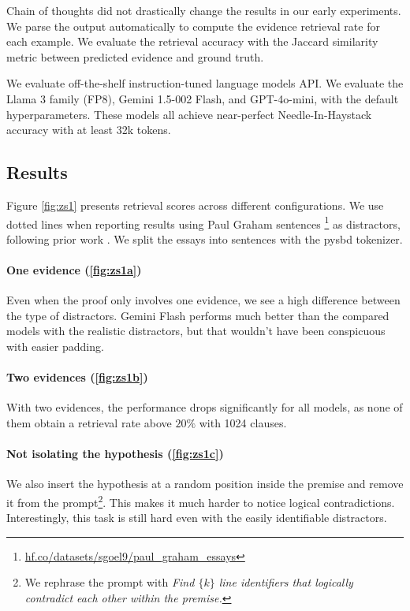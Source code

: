\documentclass[11pt]{article}
\begin{document}
Chain of thoughts did not drastically change the results in our early experiments.  We parse the output automatically to compute the evidence retrieval rate for each example. We evaluate the retrieval accuracy with the Jaccard similarity metric between predicted evidence and ground truth.


We evaluate off-the-shelf instruction-tuned language models API. We evaluate the Llama 3 family (FP8), Gemini 1.5-002 Flash, and GPT-4o-mini, with the default hyperparameters. These models all achieve near-perfect Needle-In-Haystack accuracy with at least 32k tokens.

\subsection{Results}



Figure \ref{fig:zs1} presents retrieval scores across different configurations. We use dotted lines when reporting results using Paul Graham sentences \footnote{\href{https://hf.co/datasets/sgoel9/paul_graham_essays}{hf.co/datasets/sgoel9/paul\_graham\_essays}} as distractors, following prior work \cite{kamradt2023needlenih,li2024needlebench,levy2024same}. We split the essays into sentences with the pysbd \cite{sadvilkar-neumann-2020-pysbd} tokenizer.

\paragraph{One evidence (\ref{fig:zs1a})}
 Even when the proof only involves one evidence, we see a high difference between the type of distractors. Gemini Flash performs much better than the compared models with the realistic distractors, but that wouldn't have been conspicuous with easier padding.
\paragraph{Two evidences (\ref{fig:zs1b})} With two evidences, the performance drops significantly for all models, as none of them obtain a retrieval rate above $20\%$ with 1024 clauses.
\paragraph{Not isolating the hypothesis (\ref{fig:zs1c})}
We also insert the hypothesis at a random position inside the premise and remove it from the prompt\footnote{We rephrase the prompt with \textit{Find $\{k\}$ line identifiers that logically contradict each other within the premise.}}. This makes it much harder to notice logical contradictions. Interestingly, this task is still hard even with the easily identifiable distractors.
\end{document}
